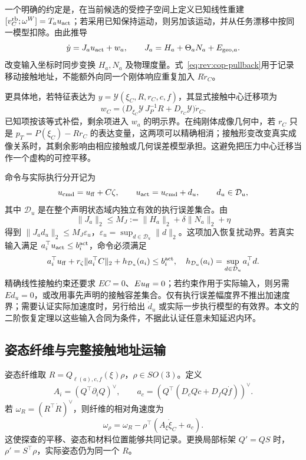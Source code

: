 \documentclass[11pt,a4paper]{article}
\numberwithin{equation}{section}
\theoremstyle{definition}
\begin{document}
一个明确的约定是，在当前候选的受控子空间上定义已知线性重建 $[v_C^{\rm rb};\omega^W]=T_a u_{\rm act}$；若采用已知保持运动，则另加该运动，并从任务漂移中按同一模型扣除。由此推导
\begin{equation}
 \dot y=J_a u_{\rm act}+w_a,\qquad J_a=H_a+\Theta_aN_a+E_{{\rm geo},a}.
 \label{eq:rev:actual-rigid-model}
\end{equation}
改变输入坐标时同步变换 $H_a,N_a$ 及物理度量。式~\eqref{eq:rev:cop-pullback}用于记录移动接触地址，不能额外向同一个刚体响应重复加入 $R\dot r_C$。

更具体地，若特征表达为 $y=\mathcal Y(\xi_C,R,r_C,c,f)$，其显式接触中心迁移项为
\begin{equation}
 w_C=\bigl(D_{\xi_C}\mathcal Y\,J_P^{-1}R+D_{r_C}\mathcal Y\bigr)\dot r_C.
 \label{eq:rev:cop-feature-drift}
\end{equation}
已知项按该等式补偿，剩余项进入 $w_a$ 的明示界。在纯刚体成像几何中，若 $r_C$ 只是 $p_T=P(\xi_C)-Rr_C$ 的表达变量，这两项可以精确相消；接触形变改变真实成像关系时，其剩余影响由相应接触或几何误差模型承担。这避免把压力中心迁移当作一个虚构的可控平移。

命令与实际执行分开记为
\begin{equation}
 u_{\rm cmd}=u_{\rm ff}+C\zeta,\qquad
 u_{\rm act}=u_{\rm cmd}+d_u,\qquad d_u\in\mathcal D_u,
 \label{eq:rev:execution-contract}
\end{equation}
其中 $\mathcal D_u$ 是在整个声明状态域内独立有效的执行误差集合。由
\begin{equation}
 \|J_a\|_2\le M_J:=\|H_a\|_2+\delta\|N_a\|_2+\eta
\end{equation}
得到 $\|J_ad_u\|_2\le M_J\varepsilon_u$，$\varepsilon_u=\sup_{d\in\mathcal D_u}\|d\|_2$。这项加入恢复扰动界。若真实输入满足 $a_i^\top u_{\rm act}\le b_i^{\rm act}$，命令必须满足
\begin{equation}
 a_i^\top u_{\rm ff}+r_\zeta\|a_i^\top C\|_2
 +h_{\mathcal D_u}(a_i)\le b_i^{\rm act},
 \quad h_{\mathcal D_u}(a_i)=\sup_{d\in\mathcal D_u}a_i^\top d.
 \label{eq:rev:tightened-input}
\end{equation}
精确线性接触约束还要求 $EC=0$、$Eu_{\rm ff}=0$；若约束作用于实际输入，则另需 $Ed_u=0$，或改用事先声明的接触容差集合。仅有执行误差幅度界不推出加速度界；需要认证实际加速度时，另行给出 $\dot d_u$ 或实际一步执行模型的有效界。本文的二阶恢复定理以这些输入合同为条件，不据此认证任意未知延迟内环。

\subsection{姿态纤维与完整接触地址运输}
姿态纤维取 $R=Q_{\ell(a),c,f}(\xi)\rho$，$\rho\in SO(3)$。定义
\begin{equation}
 A_i=(Q^\top\partial_iQ)^\vee,\qquad
 a_c=(Q^\top(D_cQ\dot c+D_fQ\dot f))^\vee .
\end{equation}
若 $\omega_R=(R^\top\dot R)^\vee$，则纤维的相对角速度为
\begin{equation}
 \omega_\rho=\omega_R-\rho^\top(A_\xi\dot\xi_C+a_c).
\end{equation}
这使探查的平移、姿态和材料位置能够共同记录。更换局部标架 $Q'=QS$ 时，$\rho'=S^\top\rho$，实际姿态仍为同一个 $R$。
\end{document}
